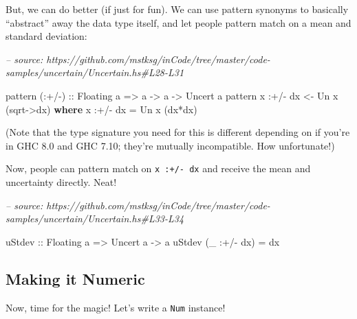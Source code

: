 \documentclass[]{article}
\newenvironment{Shaded}{}{}
\newcommand{\CommentTok}[1]{\textcolor[rgb]{0.38,0.63,0.69}{\textit{#1}}}
\newcommand{\DataTypeTok}[1]{\textcolor[rgb]{0.56,0.13,0.00}{#1}}
\newcommand{\FunctionTok}[1]{\textcolor[rgb]{0.02,0.16,0.49}{#1}}
\newcommand{\KeywordTok}[1]{\textcolor[rgb]{0.00,0.44,0.13}{\textbf{#1}}}
\newcommand{\NormalTok}[1]{#1}
\newcommand{\OtherTok}[1]{\textcolor[rgb]{0.00,0.44,0.13}{#1}}
\begin{document}
But, we can do better (if just for fun). We can use pattern synonyms to
basically ``abstract'' away the data type itself, and let people pattern match
on a mean and standard deviation:

\begin{Shaded}
\begin{Highlighting}[]
\CommentTok{-- source: https://github.com/mstksg/inCode/tree/master/code-samples/uncertain/Uncertain.hs#L28-L31}

\NormalTok{pattern}\OtherTok{ (:+/-) ::} \DataTypeTok{Floating}\NormalTok{ a }\OtherTok{=>}\NormalTok{ a }\OtherTok{->}\NormalTok{ a }\OtherTok{->} \DataTypeTok{Uncert}\NormalTok{ a}
\NormalTok{pattern x }\FunctionTok{:+/-}\NormalTok{ dx }\OtherTok{<-} \DataTypeTok{Un}\NormalTok{ x (sqrt}\OtherTok{->}\NormalTok{dx)}
  \KeywordTok{where}
\NormalTok{    x }\FunctionTok{:+/-}\NormalTok{ dx }\FunctionTok{=} \DataTypeTok{Un}\NormalTok{ x (dx}\FunctionTok{*}\NormalTok{dx)}
\end{Highlighting}
\end{Shaded}

(Note that the type signature you need for this is different depending on if
you're in GHC 8.0 and GHC 7.10; they're mutually incompatible. How unfortunate!)

Now, people can pattern match on \texttt{x\ :+/-\ dx} and receive the mean and
uncertainty directly. Neat!

\begin{Shaded}
\begin{Highlighting}[]
\CommentTok{-- source: https://github.com/mstksg/inCode/tree/master/code-samples/uncertain/Uncertain.hs#L33-L34}

\OtherTok{uStdev ::} \DataTypeTok{Floating}\NormalTok{ a }\OtherTok{=>} \DataTypeTok{Uncert}\NormalTok{ a }\OtherTok{->}\NormalTok{ a}
\NormalTok{uStdev (_ }\FunctionTok{:+/-}\NormalTok{ dx) }\FunctionTok{=}\NormalTok{ dx}
\end{Highlighting}
\end{Shaded}

\hypertarget{making-it-numeric}{%
\subsection{Making it Numeric}\label{making-it-numeric}}

Now, time for the magic! Let's write a \texttt{Num} instance!
\end{document}
